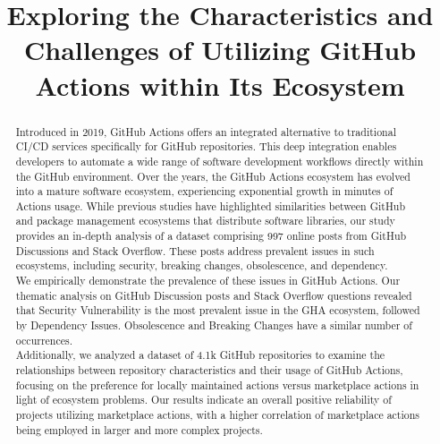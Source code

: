 \documentclass[conference]{IEEEtran}
\begin{document}
\title{Exploring the Characteristics and Challenges of Utilizing GitHub Actions within Its Ecosystem\\}

\author{
\and
{}
}

\maketitle

\begin{abstract}
  Introduced in 2019, GitHub Actions offers an integrated alternative to traditional CI/CD services specifically for GitHub repositories. This deep integration enables developers to automate a wide range of software development workflows directly within the GitHub environment. Over the years, the GitHub Actions ecosystem has evolved into a mature software ecosystem, experiencing exponential growth in minutes of Actions usage. While previous studies have highlighted similarities between GitHub and package management ecosystems that distribute software libraries, our study provides an in-depth analysis of a dataset comprising 997 online posts from GitHub Discussions and Stack Overflow. These posts address prevalent issues in such ecosystems, including security, breaking changes, obsolescence, and dependency. \\
  We empirically demonstrate the prevalence of these issues in GitHub Actions. Our thematic analysis on GitHub Discussion posts and Stack Overflow questions revealed that Security Vulnerability is the most prevalent issue in the GHA ecosystem, followed by Dependency Issues. Obsolescence and Breaking Changes have a similar number of occurrences. \\
   Additionally, we analyzed a dataset of 4.1k GitHub repositories to examine the relationships between repository characteristics and their usage of GitHub Actions, focusing on the preference for locally maintained actions versus marketplace actions in light of ecosystem problems. Our results indicate an overall positive reliability of projects utilizing marketplace actions, with a higher correlation of marketplace actions being employed in larger and more complex projects. \\ 
 \end{abstract}
\end{document}
